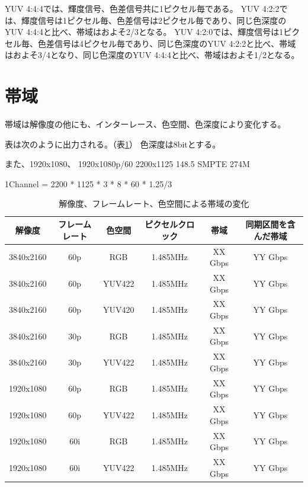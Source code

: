 
YUV 4:4:4では、輝度信号、色差信号共に1ピクセル毎である。
YUV 4:2:2では、輝度信号は1ピクセル毎、色差信号は2ピクセル毎であり、同じ色深度のYUV 4:4:4と比べ、帯域はおよそ2/3となる。
YUV 4:2:0では、輝度信号は1ピクセル毎、色差信号は4ピクセル毎であり、同じ色深度のYUV 4:2:2と比べ、帯域はおよそ3/4となり、同じ色深度のYUV 4:4:4と比べ、帯域はおよそ1/2となる。


\section{帯域}
\label{sec:bandwidth}

帯域は解像度の他にも、インターレース、色空間、色深度により変化する。

表は次のように出力される。（表\ref{tb:video-bandwidth}）
色深度は8bitとする。

また、1920x1080、
1920x1080p/60 2200x1125 148.5 SMPTE 274M

1Channel = 2200 * 1125 * 3 * 8 * 60 * 1.25/3

\begin{table}[htbp]
  \caption{解像度、フレームレート、色空間による帯域の変化}
  \label{tb:video-bandwidth}
  \begin{center}
  \begin{tabular}{c|c|c|c|c|c}
    \hline
    解像度     & フレームレート & 色空間  & ピクセルクロック & 帯域     & 同期区間を含んだ帯域 \\\hline\hline
    3840x2160 & 60p          & RGB    & 1.485MHz      & XX Gbps & YY Gbps           \\\hline
    3840x2160 & 60p          & YUV422 & 1.485MHz      & XX Gbps & YY Gbps           \\\hline
    3840x2160 & 60p          & YUV420 & 1.485MHz      & XX Gbps & YY Gbps           \\\hline
    3840x2160 & 30p          & RGB    & 1.485MHz      & XX Gbps & YY Gbps           \\\hline
    3840x2160 & 30p          & YUV422 & 1.485MHz      & XX Gbps & YY Gbps           \\\hline
    1920x1080 & 60p          & RGB    & 1.485MHz      & XX Gbps & YY Gbps           \\\hline
    1920x1080 & 60p          & YUV422 & 1.485MHz      & XX Gbps & YY Gbps           \\\hline
    1920x1080 & 60i          & RGB    & 1.485MHz      & XX Gbps & YY Gbps           \\\hline
    1920x1080 & 60i          & YUV422 & 1.485MHz      & XX Gbps & YY Gbps           \\\hline
  \end{tabular}\end{center}
\end{table}

